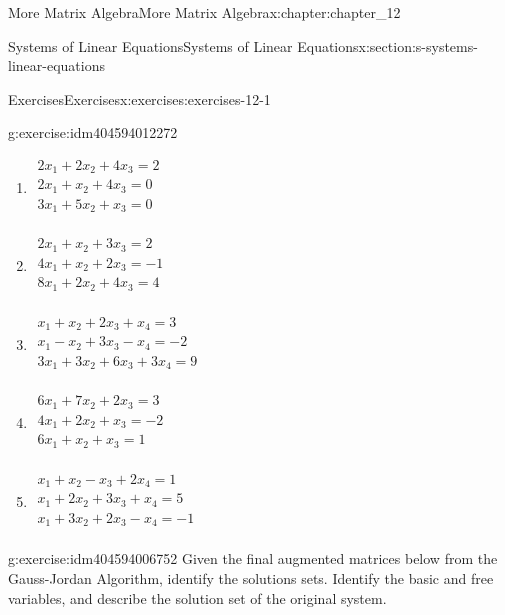 \documentclass[twoside,10pt,]{book}
\numberwithin{equation}{section}
\begin{document}
\begin{chapterptx}{More Matrix Algebra}{}{More Matrix Algebra}{}{}{x:chapter:chapter_12}
\begin{sectionptx}{Systems of Linear Equations}{}{Systems of Linear Equations}{}{}{x:section:s-systems-linear-equations}
\begin{exercises-subsection}{Exercises}{}{Exercises}{}{}{x:exercises:exercises-12-1}
\begin{divisionexercise}{2}{}{}{g:exercise:idm404594012272}
\begin{multicols}{2}
\begin{enumerate}[label=(\alph*)]
\item{}\(\begin{array}{l}
2 x_1+2 x_2+4 x_3=2 \\
2 x_1+x_2+4 x_3=0 \\
3 x_1+5 x_2+x_3=0 \\
\end{array}\)%
\item{}\(\begin{array}{l}
2 x_1+x_2+3 x_3=2 \\
4 x_1+x_2+2 x_3=-1 \\
8 x_1+2 x_2+4 x_3=4 \\
\end{array}\)%
\item{}\(\begin{array}{l}
x_1+x_2+2 x_3+x_4=3 \\
x_1-x_2+3 x_3-x_4=-2 \\
3 x_1+3 x_2+6 x_3+3 x_4=9 \\
\end{array}\)%
\item{}\(\begin{array}{l}
6 x_1+7 x_2+2 x_3=3 \\
4 x_1+2 x_2+x_3=-2 \\
6 x_1+x_2+x_3=1 \\
\end{array}\)%
\item{}\(\begin{array}{l}
x_1+x_2-x_3+2 x_4=1 \\
x_1+2 x_2+3 x_3+x_4=5 \\
x_1+3 x_2+2 x_3-x_4=-1 \\
\end{array}\)%
\end{enumerate}
\end{multicols}
%
\end{divisionexercise}%
\begin{divisionexercise}{3}{}{}{g:exercise:idm404594006752}%
Given the final augmented matrices below from the Gauss-Jordan Algorithm, identify the solutions sets. Identify the basic and free variables, and describe the solution set of the original system.%
\begin{multicols}{2}
\end{multicols}
\end{divisionexercise}
\end{exercises-subsection}
\end{sectionptx}
\end{chapterptx}
\end{document}
